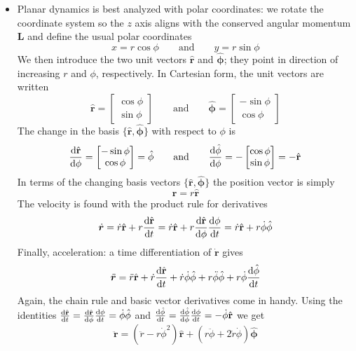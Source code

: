 \documentclass[11pt, a4paper]{article}
\newcommand{\eqtext}[1]{\qquad \text{#1} \qquad}
\newcommand{\uvec}[1]{\hat{\mathbf{#1}}}
\newcommand{\bdot}[1]{\dot{\bm{#1}}}
\newcommand{\bddot}[1]{\ddot{\bm{#1}}}
\begin{document}
\begin{itemize}
	\item Planar dynamics is best analyzed with polar coordinates: we rotate the coordinate system so the $ z $ axis aligns with the conserved angular momentum $ \bm{L} $ and define the usual polar coordinates
	\begin{equation*}
		x = r \cos \phi \eqtext{and} y = r \sin \phi 
	\end{equation*}
	We then introduce the two unit vectors $ \uvec{r} $ and $ \uvec{\phi} $; they point in direction of increasing $ r $ and $ \phi $, respectively. In Cartesian form, the unit vectors are written
	\begin{equation*}
		\uvec{r} = 
		\begin{bmatrix}
			\cos \phi\\
			\sin \phi
		\end{bmatrix} \eqtext{and}
		\uvec{\phi} = 
		\begin{bmatrix}
 			- \sin \phi\\
 			\cos \phi
 		\end{bmatrix} 
	\end{equation*}
	The change in the basis $ \{\uvec{r}, \uvec{\phi} \} $ with respect to $ \phi $ is
	\begin{equation*}
		\dv{\uvec{r}}{\phi} = 
		\begin{bmatrix}
 			- \sin \phi\\
 			\cos \phi
 		\end{bmatrix} = \uvec{\phi} \eqtext{and}
 		\dv{\uvec{\phi}}{\phi} = - 
 		\begin{bmatrix}
			\cos \phi\\
			\sin \phi
		\end{bmatrix} = - \uvec{r}
	\end{equation*}
	In terms of the changing basis vectors $ \{\uvec{r}, \uvec{\phi} \} $ the position vector is simply
	\begin{equation*}
		\bm{r} = r \uvec{r}
	\end{equation*}
	The velocity is found with the product rule for derivatives
	\begin{equation*}
		\bdot{r} = \dot{r}\uvec{r} + r \dv{\uvec{r}}{t} =  \dot{r}\uvec{r} + r \dv{\uvec{r}}{\phi} \dv{\phi}{t} = \dot{r}\uvec{r} + r \dot{\phi} \uvec{\phi}
	\end{equation*}
	Finally, acceleration: a time differentiation of $ \bdot{r} $ gives
	\begin{equation*}
		\bddot{r} = \ddot{r}\uvec{r} + \dot{r}\dv{\uvec{r}}{t}
		+ \dot{r}\dot{\phi} \uvec{\phi} + r\ddot{\phi} \uvec{\phi} + r\dot{\phi} \dv{\uvec{\phi} }{t}
	\end{equation*}
	Again, the chain rule and basic vector derivatives come in handy. Using the identities $ \dv{\uvec{r}}{t} = \dv{\uvec{r}}{\phi} \dv{\phi}{t} = \dot{\phi} \uvec{\phi}$ and $ \dv{\uvec{\phi}}{t} = \dv{\uvec{\phi}}{\phi} \dv{\phi}{t} = - \dot{\phi} \uvec{r}$ we get
	\begin{equation*}
		\bddot{r} = (\ddot{r} - r\dot{\phi}^{2}) \uvec{r} + (r \ddot{\phi} + 2 \dot{r} \dot{\phi}) \uvec{\phi}
	\end{equation*}


\end{itemize}
\end{document}
